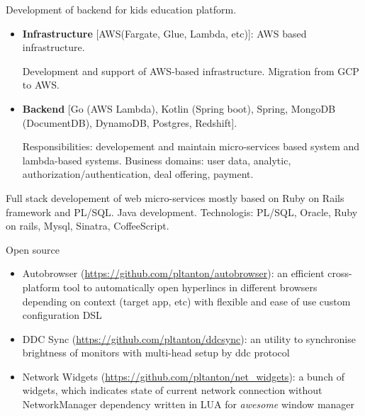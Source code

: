 \documentclass{cv}
\begin{document}
\begin{cvblock}{%
		}

	Development of backend for kids education platform.

	\begin{itemize}
		\item \textbf{Infrastructure} [AWS(Fargate, Glue, Lambda, etc)]: AWS based infrastructure.

		      Development and support of AWS-based infrastructure. Migration from GCP to AWS.

		\item \textbf{Backend} [Go (AWS Lambda), Kotlin (Spring boot), Spring, MongoDB (DocumentDB), DynamoDB, Postgres, Redshift].

		      Responsibilities: developement and maintain micro-services based system and lambda-based systems. Business domains:
		      user data, analytic, authorization/authentication, deal offering, payment.
	\end{itemize}
\end{cvblock}


\begin{cvblock}{%
		}

	Full stack developement of web micro-services mostly based on Ruby on Rails framework and PL/SQL\@.
	Java development. Technologis: PL/SQL, Oracle, Ruby on rails, Mysql, Sinatra, CoffeeScript.
\end{cvblock}

\begin{cvblock}{Open source}
	\begin{itemize}
		\item Autobrowser
		      (\url{https://github.com/pltanton/autobrowser}):
		      an efficient cross-platform tool to automatically open hyperlincs in different
		      browsers depending on context (target app, etc) with flexible and ease of use custom
		      configuration DSL
		\item DDC Sync
		      (\url{https://github.com/pltanton/ddcsync}):
		      an utility to synchronise brightness of monitors with multi-head setup by ddc protocol
		\item Network Widgets
		      (\url{https://github.com/pltanton/net_widgets}):
		      a bunch of widgets, which indicates state of current network connection
		      without NetworkManager dependency written in LUA for
		      \textit{awesome} window manager
	\end{itemize}
\end{cvblock}
\end{document}
